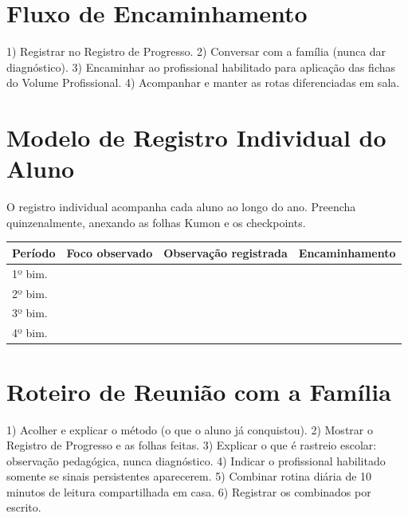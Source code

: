 \section{Fluxo de Encaminhamento}

1) Registrar no Registro de Progresso. 2) Conversar com a família (nunca dar diagnóstico). 3) Encaminhar ao profissional habilitado para aplicação das fichas do Volume Profissional. 4) Acompanhar e manter as rotas diferenciadas em sala.

\section{Modelo de Registro Individual do Aluno}

O registro individual acompanha cada aluno ao longo do ano. Preencha quinzenalmente, anexando as folhas Kumon e os checkpoints.

\begin{center}
\renewcommand{\arraystretch}{1.5}
\begin{tabular}{@{}p{3cm}p{3cm}p{5cm}p{3cm}@{}}
\toprule
Período & Foco observado & Observação registrada & Encaminhamento \\
\midrule
1º bim. & & & \\
2º bim. & & & \\
3º bim. & & & \\
4º bim. & & & \\
\bottomrule\end{tabular}\end{center}

\section{Roteiro de Reunião com a Família}

1) Acolher e explicar o método (o que o aluno já conquistou). 2) Mostrar o Registro de Progresso e as folhas feitas. 3) Explicar o que é rastreio escolar: observação pedagógica, nunca diagnóstico. 4) Indicar o profissional habilitado somente se sinais persistentes aparecerem. 5) Combinar rotina diária de 10 minutos de leitura compartilhada em casa. 6) Registrar os combinados por escrito.
